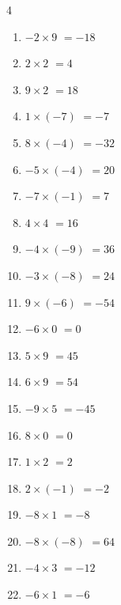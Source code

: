 \begin{multicols}{4}
\begin{enumerate}
\resetques

  \item $-2\times 9$
        $=-18$

  \item $2\times 2$
        $=4$

  \item $9\times 2$
        $=18$

  \item $1\times (-7)$
        $=-7$

  \item $8\times (-4)$
        $=-32$

  \item $-5\times (-4)$
        $=20$

  \item $-7\times (-1)$
        $=7$

  \item $4\times 4$
        $=16$

  \item $-4\times (-9)$
        $=36$

  \item $-3\times (-8)$
        $=24$

  \item $9\times (-6)$
        $=-54$

  \item $-6\times 0$
        $=0$

  \item $5\times 9$
        $=45$

  \item $6\times 9$
        $=54$

  \item $-9\times 5$
        $=-45$

  \item $8\times 0$
        $=0$

  \item $1\times 2$
        $=2$

  \item $2\times (-1)$
        $=-2$

  \item $-8\times 1$
        $=-8$

  \item $-8\times (-8)$
        $=64$

  \item $-4\times 3$
        $=-12$

  \item $-6\times 1$
        $=-6$


\end{enumerate}
\end{multicols}
